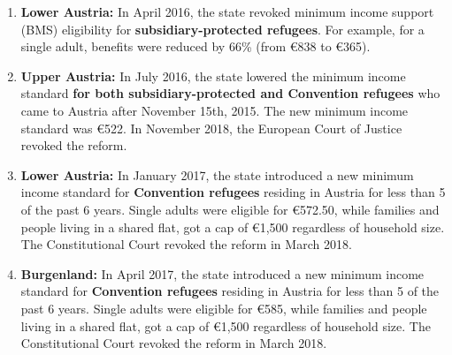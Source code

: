 \begin{enumerate}
    \item \textbf{Lower Austria:} In April 2016, the state revoked minimum income support (BMS) eligibility for \textbf{subsidiary-protected refugees}. For example, for a single adult, benefits were reduced by 66\% (from €838 to €365). %
    \item \textbf{Upper Austria:} In July 2016, the state lowered the minimum income standard \textbf{for both subsidiary-protected and Convention refugees} who came to Austria after November 15th, 2015. The new minimum income standard was €522. In November 2018, the European Court of Justice revoked the reform.
    \item \textbf{Lower Austria:} In January 2017, the state introduced a new minimum income standard for \textbf{Convention refugees} residing in Austria for less than 5 of the past 6 years. Single adults were eligible for €572.50, while families and people living in a shared flat, got a cap of €1,500 regardless of household size. The Constitutional Court revoked the reform in March 2018.
    \item \textbf{Burgenland:} In April 2017, the state introduced a new minimum income standard for \textbf{Convention refugees} residing in Austria for less than 5 of the past 6 years. Single adults were eligible for €585, while families and people living in a shared flat, got a cap of €1,500 regardless of household size. The Constitutional Court revoked the reform in March 2018.
\end{enumerate}

%     


